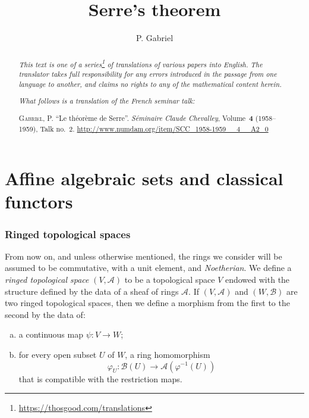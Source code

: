 \documentclass{article}
\title{Serre's theorem}
\author{P. Gabriel}
\date{}
\newcommand{\doctype}{French seminar talk}
\newcommand{\origcit}{%
  \textsc{Gabriel, P.}
  ``Le th\'{e}or\`{e}me de Serre''.
  \emph{S\'{e}minaire Claude Chevalley}, Volume~\textbf{4} (1958--1959), Talk no.~2.
  {\url{http://www.numdam.org/item/SCC_1958-1959__4__A2_0}}%
}
\newcommand{\scr}[1]{{\mathscr{#1}}}
\newcommand{\oldpage}[1]{\marginpar{\footnotesize$\Big\vert$ \textit{p.~#1}}}
\begin{document}
\maketitle
\thispagestyle{fancy}

\renewcommand{\abstractname}{Translator's note.}

\begin{abstract}
  \renewcommand*{\thefootnote}{\fnsymbol{footnote}}
  \emph{This text is one of a series\footnote{\url{https://thosgood.com/translations}} of translations of various papers into English.}
  \emph{The translator takes full responsibility for any errors introduced in the passage from one language to another, and claims no rights to any of the mathematical content herein.}

  \medskip
  
  \emph{What follows is a translation of the \doctype:}

  \medskip\noindent
  \origcit
\end{abstract}

\setcounter{footnote}{0}

\tableofcontents
\bigskip



\part{Affine algebraic sets and classical functors}
\label{chapterA}


\section{Ringed topological spaces}
\label{section1}

\oldpage{2-01}

From now on, and unless otherwise mentioned, the rings we consider will be assumed to be commutative, with a unit element, and \emph{Noetherian}.
We define a \emph{ringed topological space} $(V,\scr{A})$ to be a topological space $V$ endowed with the structure defined by the data of a sheaf of rings $\scr{A}$.
If $(V,\scr{A})$ and $(W,\scr{B})$ are two ringed topological spaces, then we define a morphism from the first to the second by the data of:
\begin{enumerate}[(a)]
  \item a continuous map $\psi\colon V\to W$;
  \item for every open subset $U$ of $W$, a ring homomorphism
    \[
      \varphi_U\colon\scr{B}(U)\to\scr{A}(\varphi^{-1}(U))
    \]
    that is compatible with the restriction maps.
\end{enumerate}
\end{document}
